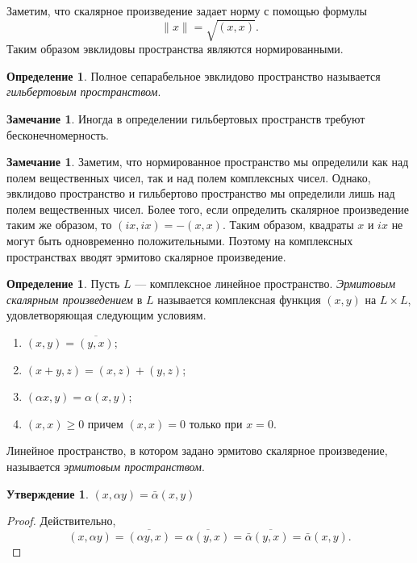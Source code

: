 \documentclass[12pt, titlepage, oneside]{amsbook}
\newtheorem{claim}[theorem]{Утверждение}
\theoremstyle{definition}
\newtheorem{definition}[theorem]{Определение}
\newtheorem{remark}[theorem]{Замечание}
\theoremstyle{remark}
\begin{document}
Заметим, что скалярное произведение задает норму с помощью формулы $$\|x\|=\sqrt{(x,x)}.$$ Таким образом эвклидовы пространства являются нормированными.

\begin{definition}
	Полное сепарабельное эвклидово пространство называется \emph{гильбертовым пространством}.
\end{definition}

\begin{remark}
	Иногда в определении гильбертовых пространств требуют бесконечномерность.
\end{remark}

\begin{remark}
	Заметим, что нормированное пространство мы определили как над полем вещественных чисел, так и над полем комплексных чисел. Однако, эвклидово пространство и гильбертово пространство мы определили лишь над полем вещественных чисел. Более того, если определить скалярное произведение таким же образом, то $(ix,ix)=-(x,x)$. Таким образом, квадраты $x$ и $ix$ не могут быть одновременно положительными. Поэтому на комплексных пространствах вводят эрмитово скалярное произведение.
\end{remark}

\begin{definition}
	Пусть $L$ --- комплексное линейное пространство. \emph{Эрмитовым скалярным произведением} в $L$ называется комплексная функция $(x,y)$ на $L\times L$, удовлетворяющая следующим условиям.
	\begin{enumerate}
		\item $(x,y)=\overline{(y,x)}$;
		\item $(x+y,z)=(x,z)+(y,z)$;
		\item $(\alpha x,y)=\alpha (x,y)$;
		\item $(x,x)\geq 0$ причем $(x,x)=0$ только при $x=0$.
	\end{enumerate}
	Линейное пространство, в котором задано эрмитово скалярное произведение, называется \emph{эрмитовым пространством}.
\end{definition}

\begin{claim}
	\label{Er1} $(x,\alpha y)=\bar{\alpha}(x,y)$
\end{claim}

\begin{proof}
	Действительно, $$(x,\alpha y)=\overline{(\alpha y,x)}=\overline{\alpha(y,x)}=\bar{\alpha}\overline{(y,x)}=\bar{\alpha}(x,y).$$
\end{proof}
\end{document}
